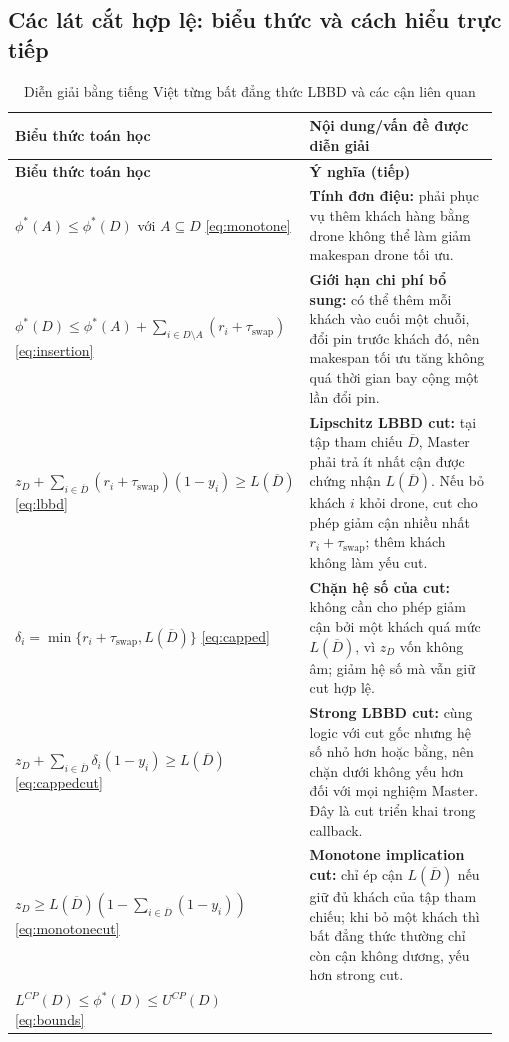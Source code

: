 \documentclass[11pt,a4paper]{article}
\theoremstyle{definition}
\theoremstyle{plain}
\theoremstyle{remark}
\newcommand{\sw}{\tau_{\mathrm{swap}}}
\newcommand{\opt}{\phi^*}
\newcommand{\barD}{\overline D}
\begin{document}
\subsection{Các lát cắt hợp lệ: biểu thức và cách hiểu trực tiếp}
\label{subsec:lbbd-meaning}
\begingroup
\small\renewcommand{\arraystretch}{1.39}
\begin{longtable}{@{}p{0.49\linewidth}p{0.47\linewidth}@{}}
\caption{Diễn giải bằng tiếng Việt từng bất đẳng thức LBBD và các cận liên quan}\label{tab:lbbd-meaning}\\
\toprule
\textbf{Biểu thức toán học} & \textbf{Nội dung/vấn đề được diễn giải}\\\midrule
\endfirsthead
\toprule
\textbf{Biểu thức toán học} & \textbf{Ý nghĩa (tiếp)}\\\midrule
\endhead
\bottomrule
\endfoot
$\opt(A)\le\opt(D)$ với $A\subseteq D$ \eqref{eq:monotone}
& \textbf{Tính đơn điệu:} phải phục vụ thêm khách hàng bằng drone không thể làm giảm makespan drone tối ưu.\\
$\displaystyle\opt(D)\le\opt(A)+\sum_{i\in D\setminus A}(r_i+\sw)$ \eqref{eq:insertion}
& \textbf{Giới hạn chi phí bổ sung:} có thể thêm mỗi khách vào cuối một chuỗi, đổi pin trước khách đó, nên makespan tối ưu tăng không quá thời gian bay cộng một lần đổi pin.\\
$\displaystyle z_D+\sum_{i\in\barD}(r_i+\sw)(1-y_i)\ge L(\barD)$ \eqref{eq:lbbd}
& \textbf{Lipschitz LBBD cut:} tại tập tham chiếu $\barD$, Master phải trả ít nhất cận được chứng nhận $L(\barD)$. Nếu bỏ khách $i$ khỏi drone, cut cho phép giảm cận nhiều nhất $r_i+\sw$; thêm khách không làm yếu cut.\\
$\displaystyle\delta_i=\min\{r_i+\sw,L(\barD)\}$ \eqref{eq:capped}
& \textbf{Chặn hệ số của cut:} không cần cho phép giảm cận bởi một khách quá mức $L(\barD)$, vì $z_D$ vốn không âm; giảm hệ số mà vẫn giữ cut hợp lệ.\\
$\displaystyle z_D+\sum_{i\in\barD}\delta_i(1-y_i)\ge L(\barD)$ \eqref{eq:cappedcut}
& \textbf{Strong LBBD cut:} cùng logic với cut gốc nhưng hệ số nhỏ hơn hoặc bằng, nên chặn dưới không yếu hơn đối với mọi nghiệm Master. Đây là cut triển khai trong callback.\\
$\displaystyle z_D\ge L(\barD)\left(1-\sum_{i\in\barD}(1-y_i)\right)$ \eqref{eq:monotonecut}
& \textbf{Monotone implication cut:} chỉ ép cận $L(\barD)$ nếu giữ đủ khách của tập tham chiếu; khi bỏ một khách thì bất đẳng thức thường chỉ còn cận không dương, yếu hơn strong cut.\\
$\displaystyle L^{CP}(D)\le\opt(D)\le U^{CP}(D)$ \eqref{eq:bounds}

\end{longtable}
\end{document}
